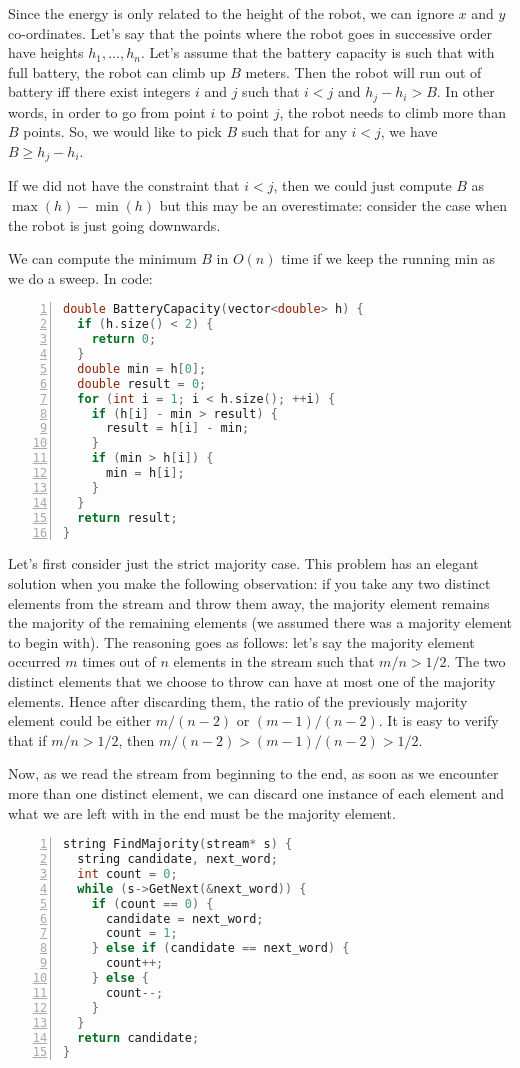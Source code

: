 Since the energy is only related to the height of the robot, we can
ignore $x$ and $y$ co-ordinates. Let's say that the points where the
robot goes in successive order have heights $h_1,\ldots,h_n$.
Let's assume that the battery capacity is such that with full battery, the robot can climb up $B$ meters. Then the robot will  run
out of battery iff there exist integers $i$ and $j$ such that $i <
j$ and $h_j - h_i > B$. In other words, in order to go from point $i$
to point $j$, the robot needs to climb more than $B$ points.  So, we
would like to pick $B$ such that for any $i < j$, we have $B \ge h_j - h_i$.

If we did not have the constraint that $i < j$, then we could just
compute $B$ as $\max(h) - \min(h)$ but this may be an overestimate:
consider the case when the robot is just going downwards.  

We can compute the minimum $B$ in $O(n)$ time 
if we keep the running min as we do a sweep. In code:
\begin{lstlisting}[basicstyle=\footnotesize,numbers=left,breaklines=true,language=C++]
double BatteryCapacity(vector<double> h) {
  if (h.size() < 2) {
    return 0;
  }
  double min = h[0];
  double result = 0;
  for (int i = 1; i < h.size(); ++i) {
    if (h[i] - min > result) {
      result = h[i] - min;
    }
    if (min > h[i]) {
      min = h[i];
    }
  }
  return result;
}
\end{lstlisting}

Let's first consider just the strict majority case.
This problem has an elegant solution when you make the following
observation: if you take any two distinct elements from the stream
and throw them away, the majority element remains the majority of the remaining
elements (we assumed there was a majority element to begin with). The reasoning goes
as follows: let's say the majority element occurred $m$ times out
of $n$ elements in the stream such that $m/n > 1/2$.  The two distinct
elements that we choose to throw can have at most one of the majority
elements. Hence after discarding them, the ratio of the previously
majority element could be either $m/(n-2)$ or $(m -1) /(n-2)$.  It
is easy to verify that if $m/n > 1/2$, then $m/(n-2) > (m -1) /(n-2)  > 1/2$. 

Now, as we read the stream from beginning to the end, as soon as we
encounter more than one distinct element, we can discard one instance
of each element and what we are left with in the end must be the
majority element. 
\begin{lstlisting}[basicstyle=\footnotesize,numbers=left,breaklines=true,language=C++]
string FindMajority(stream* s) {
  string candidate, next_word;
  int count = 0;
  while (s->GetNext(&next_word)) {
    if (count == 0) {
      candidate = next_word;
      count = 1;
    } else if (candidate == next_word) {
      count++;
    } else {
      count--;
    }
  }
  return candidate;
}
\end{lstlisting}

